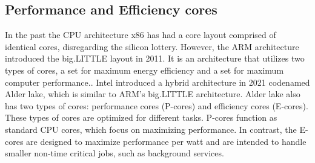 \subsection{Performance and Efficiency cores}
In the past the CPU architecture x86 has had a core layout comprised of identical cores, disregarding the silicon lottery. However, the ARM architecture introduced the big.LITTLE layout in 2011\cite{ARM2011origin}. It is an architecture that utilizes two types of cores, a set for maximum energy efficiency and a set for maximum computer performance.\cite{ARMWhatIsIt}. Intel introduced a hybrid architecture in 2021\cite{Intel2021Alder} codenamed Alder lake, which is similar to ARM's big.LITTLE architecture. Alder lake also has two types of cores: performance cores (P-cores) and efficiency cores (E-cores). These types of cores are optimized for different tasks. P-cores function as standard CPU cores, which focus on maximizing performance. In contrast, the E-cores are designed to maximize performance per watt and are intended to handle smaller non-time critical jobs, such as background services\cite{rotem2022intel}.
